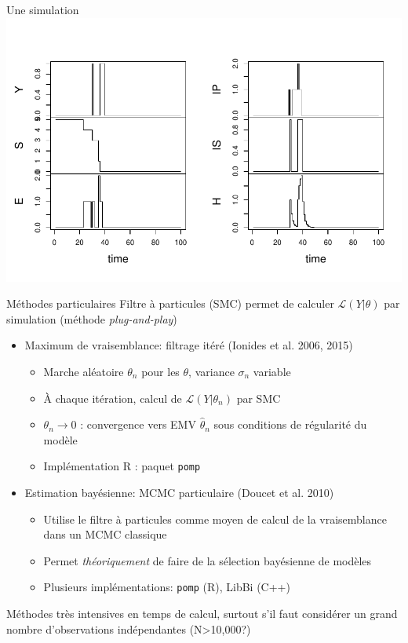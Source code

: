 \documentclass[dvipsnames,professionalfont,french]{beamer}
\begin{document}
\begin{frame}{Une simulation}
\includegraphics[width=\textwidth]{Images/SEIIR_traj.pdf}
\end{frame}

\begin{frame}{Méthodes particulaires}
Filtre à particules (SMC) permet de calculer \(\mathcal{L}(Y|\theta)\) par
simulation (méthode \emph{plug-and-play})
\begin{itemize}
\item Maximum de vraisemblance: filtrage itéré (Ionides et al. 2006, 2015)
\begin{itemize}
\item Marche aléatoire \(\theta_n\) pour les \(\theta\), variance \(\sigma_n\)
variable
\item \`A chaque itération, calcul de \(\mathcal{L}(Y|\theta_n)\) par SMC
\item \(\theta_n\to 0\) : convergence vers EMV \(\hat\theta_n\) sous conditions
de régularité du modèle
\item Implémentation R : paquet \texttt{pomp}
\end{itemize}
\item Estimation bayésienne: MCMC particulaire (Doucet et al. 2010)
\begin{itemize}
\item Utilise le filtre à particules comme moyen de calcul de la vraisemblance
dans un MCMC classique
\item Permet \emph{théoriquement} de faire de la sélection bayésienne de modèles
\item Plusieurs implémentations: \texttt{pomp} (R), LibBi (C++)
\end{itemize}
\end{itemize}
Méthodes très intensives en temps de calcul, surtout s'il faut considérer un
grand nombre d'observations indépendantes (N>10,000?)
\end{frame}
\end{document}
